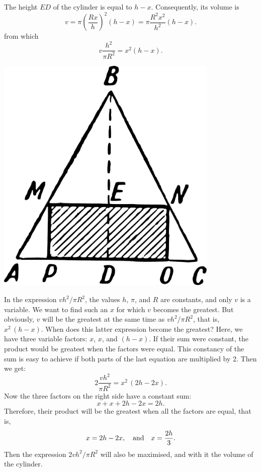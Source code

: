 The height $ED$ of the cylinder is equal to \( h - x \). Consequently, its volume is
\begin{equation*}%
 v = \pi \left(\frac{Rx}{h}\right)^{2} (h - x) = \pi \frac{R^{2} x^{2}}{h^{2}} (h - x). 
\end{equation*}
from which
\begin{equation*}%
v \frac{h^{2}}{\pi R^{2}} = x^{2} (h - x).
\end{equation*}
\begin{marginfigure}[-2cm]%
\centering
\includegraphics[width=0.8\textwidth]{figures/ch-12/fig-188.pdf}
\end{marginfigure}
In the expression \( vh^{2}/\pi R^{2}\), the values \(h\), \( \pi \), and \(R \) are constants, and only \(v \) is a variable. We want to find such an \(x \) for which \(v \) becomes the greatest. But obviously, \(v \) will be the greatest at the same time as \(vh^{2}/\pi R^{2}\), that is, \(x^{2} \, (h - x)\). When does this latter expression become the greatest? Here, we have three variable factors: \(x\), \(x\), and \((h - x)\). If their sum were constant, the product would be greatest when the factors were equal. This constancy of the sum is easy to achieve if both parts of the last equation are multiplied by 2. Then we get:
\begin{equation*}%
2 \frac{vh^{2}}{\pi R^{2}} = x^{2} \,(2h - 2x).
\end{equation*}
Now the three factors on the right side have a constant sum:
\begin{equation*}%
x + x + 2h - 2x = 2h.
\end{equation*}
Therefore, their product will be the greatest when all the factors are equal, that is,
\begin{equation*}%
x = 2h - 2x, \qand x = \frac{2h}{3}.
\end{equation*}
Then the expression \(2vh^2/\pi R^{2}\) will also be maximised, and with it the volume of the cylinder.

